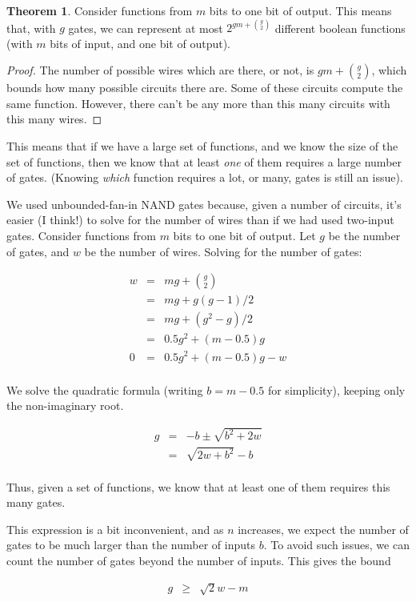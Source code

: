 \documentclass[12pt]{article}
\theoremstyle{definition}
\newtheorem{thm}{Theorem}[section]
\begin{document}
\begin{thm}
\label{boundFromCounting}
Consider functions from $m$ bits to one bit of output.
This means that, with $g$ gates, we can represent at most
$2^{gm + {g \choose 2}}$ different boolean functions (with $m$ bits of input,
and one bit of output).
\end{thm}
\begin{proof}

The number of possible wires which are there, or not, is $gm + {g \choose 2}$,
which bounds how many possible circuits there are.
Some of these circuits compute the same function.
However, there can't be any more than this many circuits with this many wires.
\end{proof}

This means that if we have a large set of functions, and we know the size of
the set of functions, then we know that at least {\em one} of them requires
a large number of gates. (Knowing {\em which} function requires a lot, or many,
gates is still an issue).

We used unbounded-fan-in NAND gates because, given a number of circuits,
it's easier (I think!) to solve for the number of wires than if we had
used two-input gates.
Consider functions from $m$ bits to one bit of output.
Let $g$ be the number of gates, and $w$ be the number of wires.
Solving for the number of gates:

\begin{eqnarray*}
w & = & mg + {g \choose 2} \\
  & = & mg + g(g-1)/2 \\
  & = & mg + (g^2 - g) / 2 \\
  & = & 0.5g^2 + (m-0.5)g \\
0 & = & 0.5g^2 + (m-0.5)g - w \\
\end{eqnarray*}

We solve the quadratic formula (writing $b = m-0.5$ for simplicity), keeping
only the non-imaginary root.

\begin{eqnarray*}
g & = & -b \pm \sqrt{ b^2 + 2w} \\
  & = & {\sqrt {2w + b^2}} - b \\
\end{eqnarray*}

Thus, given a set of functions, we know that at least one of them requires
this many gates.

This expression is a bit inconvenient, and as $n$ increases, we
expect the number of gates to be much larger than the number of
inputs $b$. To avoid such issues, we can count the number of gates
beyond the number of inputs. This gives the bound

\begin{eqnarray*}
g & \ge & {\sqrt 2w} - m \\
\end{eqnarray*}




\end{document}
